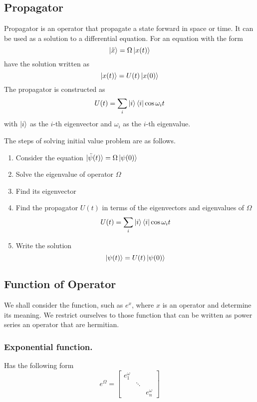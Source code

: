 \documentclass[../main.tex]{subfiles}
\begin{document}
\subsection{Propagator}
Propagator is an operator that propagate a state forward in space or time.
It can be used as a solution to a differential equation.
For an equation with the form
\begin{equation*}
	\ket{\ddot{x}}=\Omega \ket{x(t)}
\end{equation*}
have the solution written as
\begin{equation*}
	\ket{x(t)}=U(t)\ket{x(0)}
\end{equation*}
The propagator is constructed as
\begin{equation*}
	U(t)= \sum_i\ket{i} \bra{i}\cos \omega_i t
\end{equation*}
with $\ket{i }$ as the $i$-th eigenvector and $\omega_i$ as the $i$-th eigenvalue.

The steps of solving initial value problem are as follows.
\begin{enumerate}
	\item Consider the equation $\ket{\ddot{\psi}(t)}=\Omega\ket{\psi(0)}$
	\item Solve the eigenvalue of operator $\Omega$
	\item Find its eigenvector
	\item Find the propagator $U(t)$ in terms of the eigenvectors and eigenvalues
	      of $\Omega$
	      \begin{equation*}
		      U(t)= \sum_i\ket{i} \bra{i}\cos \omega_i t
	      \end{equation*}
	\item Write the solution
	      \begin{equation*}
		      \ket{\psi(t)}=U(t)\ket{\psi(0)}
	      \end{equation*}
\end{enumerate}

\subsection{Function of Operator}
We shall consider the function, such as $e^x$, where $x$ is an operator and determine its meaning.
We restrict ourselves to those function that can be written as power series an operator that are hermitian.

\subsubsection{Exponential function.}
Has the following form
\begin{equation*}
	e^\Omega=
	\begin{bmatrix}
		e^\omega_1 &        &            \\
		           & \ddots &            \\
		           &        & e^\omega_n
	\end{bmatrix}
\end{equation*}
\end{document}
